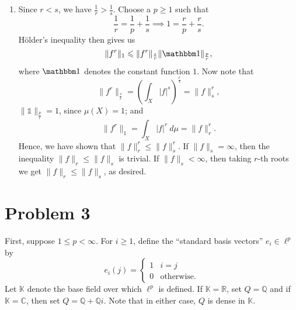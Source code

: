 \documentclass[10pt]{amsart}
\theoremstyle{thmstyle}
\theoremstyle{defstyle}
\newcommand{\R}{\mathbb{R}}
\newcommand{\Q}{\mathbb{Q}}
\newcommand{\bbC}{\mathbb{C}}
\newcommand{\K}{\mathbb{K}}
\renewcommand{\le}{\leqslant}
\renewcommand{\ge}{\geqslant}
\begin{document}
\begin{enumerate}[label=(\alph*)]
\item Since $r < s$, we have $\frac{1}{r} > \frac{1}{s}$. Choose a $p\ge 1$ such that 
\begin{equation*}
	\frac{1}{r} = \frac{1}{p} + \frac{1}{s}\implies 1 = \frac{r}{p} + \frac{r}{s}.
\end{equation*}
H\"older's inequality then gives us 
\begin{equation*}
	\|f^r\|_1\le \|f^r\|_{\frac{s}{r}}\|\mathbbm 1\|_{\frac{p}{r}},
\end{equation*}
where $\mathbbm 1$ denotes the constant function $1$. Now note that 
\begin{equation*}
	\|f^r\|_{\frac{s}{r}} = \left(\int_X |f|^s\right)^\frac{r}{s} = \|f\|_s^r,
\end{equation*}
$\|\mathbb 1\|_{\frac{p}{r}} = 1$, since $\mu(X) = 1$; and 
\begin{equation*}
	\|f^r\|_1 = \int_X |f|^r~d\mu = \|f\|_r^r.
\end{equation*}
Hence, we have shown that $\|f\|_r^r \le \|f\|_s^r$. If $\|f\|_s = \infty$, then the inequality $\|f\|_r\le \|f\|_s$ is trivial. If $\|f\|_s < \infty$, then taking $r$-th roots we get $\|f\|_r\le \|f\|_s$, as desired.
\end{enumerate}

\section{Problem 3}

First, suppose $1\le p < \infty$. For $i\ge 1$, define the ``standard basis vectors'' $e_i\in\ell^p$ by 
\begin{equation*}
	e_i(j) = 
	\begin{cases}
		1 & i = j\\
		0 & \text{otherwise}.
	\end{cases}
\end{equation*}
Let $\K$ denote the base field over which $\ell^p$ is defined. If $\K = \R$, set $Q = \Q$ and if $\K = \bbC$, then set $Q = \Q + \Q i$. Note that in either case, $Q$ is dense in $\K$.
\end{document}
